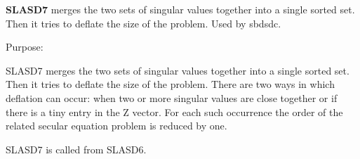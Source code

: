{\bfseries S\+L\+A\+S\+D7} merges the two sets of singular values together into a single sorted set. Then it tries to deflate the size of the problem. Used by sbdsdc. 

 \begin{DoxyParagraph}{Purpose\+: }
\begin{DoxyVerb} SLASD7 merges the two sets of singular values together into a single
 sorted set. Then it tries to deflate the size of the problem. There
 are two ways in which deflation can occur:  when two or more singular
 values are close together or if there is a tiny entry in the Z
 vector. For each such occurrence the order of the related
 secular equation problem is reduced by one.

 SLASD7 is called from SLASD6.\end{DoxyVerb}
 
\end{DoxyParagraph}

